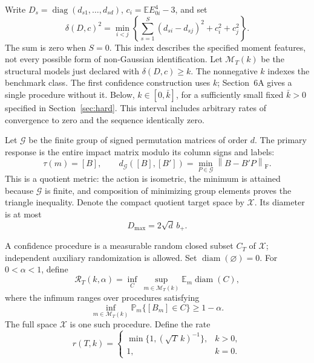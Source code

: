 \documentclass[11pt,a4paper]{article}
\numberwithin{equation}{section}
\newcommand{\E}{\mathbb E}
\newcommand{\Prob}{\mathbb P}
\newcommand{\cM}{\mathcal M}
\newcommand{\cG}{\mathcal G}
\newcommand{\cX}{\mathcal X}
\newcommand{\F}{\mathrm F}
\newcommand{\norm}[1]{\left\lVert #1\right\rVert}
\DeclareMathOperator{\diam}{diam}
\DeclareMathOperator{\diag}{diag}
\begin{document}
Write \(D_s=\diag(d_{s1},\ldots,d_{sd})\), \(c_i=\E E_{0i}^4-3\), and set
\begin{equation}\label{eq:delta}
 \delta(D,c)^2
 =\min_{i<j}\left\{\sum_{s=1}^S(d_{si}-d_{sj})^2+c_i^2+c_j^2\right\}.
\end{equation}
The sum is zero when \(S=0\). This index describes the specified moment
features, not every possible form of non-Gaussian identification.
Let \(\cM_T(k)\) be the structural models just declared with
\(\delta(D,c)\ge k\). The nonnegative \(k\) indexes the benchmark class.
The first confidence construction uses \(k\); Section~6A gives a single
procedure without it. Below, \(k\in[0,\bar k]\), for a sufficiently small
fixed \(\bar k>0\) specified in Section~\ref{sec:hard}.
This interval includes arbitrary rates of convergence to zero and the
sequence identically zero.

Let \(\cG\) be the finite group of signed permutation matrices of order \(d\).
The primary response is the entire impact matrix modulo its column signs
and labels:
\[
 \tau(m)=[B],\qquad
 d_{\cG}([B],[B'])=\min_{P\in\cG}\norm{B-B'P}_{\F}.
\]
This is a quotient metric: the action is isometric, the minimum is attained
because \(\cG\) is finite, and composition of minimizing group elements
proves the triangle inequality. Denote the compact quotient target space
by \(\cX\). Its diameter is at most
\[
 D_{\max}=2\sqrt d\,b_+.
\]

A confidence procedure is a measurable random closed subset \(C_T\) of
\(\cX\); independent auxiliary randomization is allowed. Set
\(\diam(\varnothing)=0\). For \(0<\alpha<1\), define
\[
 \mathcal R_T(k,\alpha)
 =\inf_C\ \sup_{m\in\cM_T(k)}\E_m\diam(C),
\]
where the infimum ranges over procedures satisfying
\[
 \inf_{m\in\cM_T(k)}\Prob_m\{[B_m]\in C\}\ge1-\alpha.
\]
The full space \(\cX\) is one such procedure. Define the rate
\begin{equation}\label{eq:rate}
 r(T,k)=
 \begin{cases}
  \min\{1,(\sqrt T\,k)^{-1}\},&k>0,\\
  1,&k=0.
 \end{cases}
\end{equation}
\end{document}
